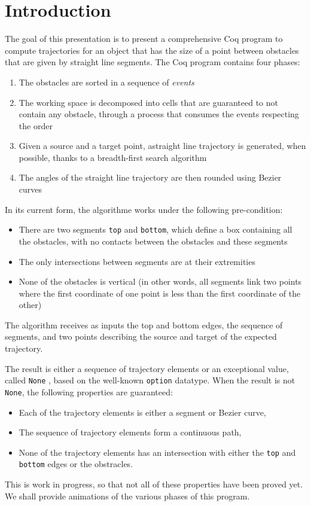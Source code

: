 \documentclass{easychair}
\begin{document}
\section{Introduction}
The goal of this presentation is to present a comprehensive Coq program
to compute trajectories for an object that has the size of a point between
obstacles that are given by straight line segments.  The Coq program
contains four phases:
\begin{enumerate}
\item The obstacles are sorted in a sequence of {\em events}
\item The working space is decomposed into cells that are guaranteed to not contain
 any obstacle,  through a process that consumes the events respecting the order
\item Given a source and a target point, astraight line trajectory is generated,
when possible, thanks to a breadth-first search algorithm
\item The angles of the straight line trajectory are then rounded using Bezier curves
\end{enumerate}
In its current form, the algorithme works under the following pre-condition:
\begin{itemize}
\item There are two segments {\tt top} and {\tt bottom}, which define a box containing
all the obstacles, with no contacts between the obstacles and these segments
\item The only intersections between segments are at their extremities
\item None of the obstacles is vertical (in other words, all segments link two points
where the first coordinate of one point is less than the first coordinate of the other)
\end{itemize}

The algorithm receives as inputs the top and bottom edges, the sequence of segments,
and two points describing the source and target of the expected trajectory.

The result is either a sequence of trajectory elements or an exceptional value, called
{\tt None} , based
on the well-known {\tt option} datatype.  When the result is not {\tt None},
the following properties are guaranteed:
\begin{itemize}
\item Each of the trajectory elements is either a segment or Bezier curve,
\item The sequence of trajectory elements form a continuous path,
\item None of the trajectory elements has an intersection with either
the {\tt top} and {\tt bottom} edges or the obstracles.
\end{itemize}
This is work in progress, so that not all of these properties have been proved yet.
We shall provide animations of the various phases of this program.
\end{document}

